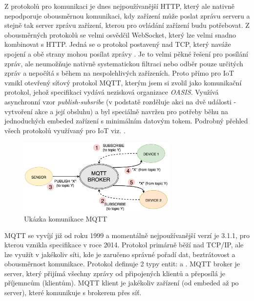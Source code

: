 Z protokolů pro komunikaci je dnes nejpoužívanější HTTP, který ale nativně nepodporuje obousměrnou komunikaci, kdy zařízení může poslat zprávu serveru a stejně tak server zprávu zařízení, kterou pro ovládání zařízení budu potřebovat. Z obousměrných protokolů se velmi osvědčil WebSocket, který lze velmi snadno kombinovat s HTTP. Jedná se o protokol postavený nad TCP, který naváže spojení a obě strany mohou posílat zprávy \cite{websocket}. Je to velmi pěkné řešení pro posílání zpráv, ale neumožňuje nativně systematickou filtraci nebo odběr pouze určitých zpráv a nepočítá s během na nespolehlivých zařízeních. Proto přímo pro IoT vznikl otevřený síťový protokol MQTT, kterým jsem si zvolil jako komunikační protokol, jehož specifikaci vydává nezisková organizace \textit{OASIS}. Využívá asynchronní vzor \textit{publish-subsribe} (v podstatě rozděluje akci na dvě události - vytvoření akce a její obsluhu) a byl speciálně navržen pro potřeby běhu na jednoduchých embeded zařízení s minimálním datovým tokem. Podrobný přehled všech protokolů využívaný pro IoT viz. \cite{protocols}.

\begin{figure}[htbp]
    \centering
    \includegraphics[width=0.7\textwidth]{img/mqtt-communication.jpeg}
    \caption{Ukázka komunikace MQTT \cite{img-mqtt-communication}}
\end{figure}

\label{mqtt-description}
MQTT se vyvíjí již od roku 1999 a momentálně nejpoužívanější verzí je 3.1.1, pro kterou vznikla specifikace v roce 2014. Protokol primárně běží nad TCP/IP, ale lze využít v jakékoliv síti, kde je zaručeno správné pořadí dat, beztrátovost a obousměrnost komunikace. Protokol definuje 2 typy entit:  a . MQTT broker je server, který přijímá všechny zprávy od připojených klientů a přeposílá je příjemncům (klientům). MQTT klient je jakékoliv zařízení (od embeded až po server), které komunikuje s brokerem přes síť. \cite{mqtt}

